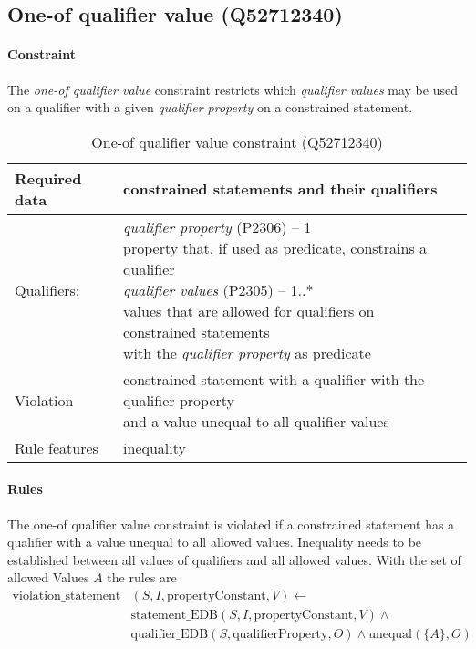 \documentclass[hyperref,bachelorofscience,fleqn]{cgvpub}
\begin{document}
\subsection{One-of qualifier value (Q52712340)}
\paragraph{Constraint}
The \emph{one-of qualifier value} constraint restricts which \emph{qualifier values} may be used on a qualifier with a given \emph{qualifier property} on a constrained statement.

\begin{table}[H]
\caption{One-of qualifier value constraint (Q52712340)}
\begin{tabularx}{\textwidth}{ ll X}
\hline
Required data & constrained statements and their qualifiers \\
\hline
Qualifiers: & \makecell{\emph{qualifier property} (P2306) -- 1 \\ property that, if used as predicate, constrains a qualifier \\
\emph{qualifier values} (P2305) -- 1..* \\ values that are allowed for qualifiers on constrained statements \\ with the \emph{qualifier property} as predicate}\\
\hline
Violation & \makecell{constrained statement with a qualifier with the qualifier property \\ and a value unequal to all qualifier values} \\
\hline
Rule features & inequality \\
\hline
\end{tabularx}
\end{table}

\paragraph{Rules}
The one-of qualifier value constraint is violated if a constrained statement has a qualifier with a value unequal to all allowed values. Inequality needs to be established between all values of qualifiers and all allowed values. With the set of allowed Values \(A\) the rules are
\begin{equation*}
\begin{split}
\text{violation\_statement}&(S, I, \text{propertyConstant}, V) \leftarrow \\
&\text{statement\_EDB}(S, I, \text{propertyConstant}, V) \wedge{} \\
&\text{qualifier\_EDB}(S, \text{qualifierProperty}, O) \wedge \text{unequal}(\{A\}, O)
\end{split}
\end{equation*}
\end{document}
